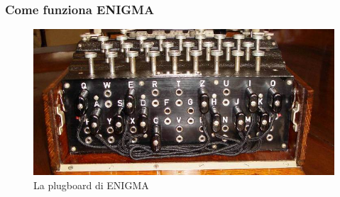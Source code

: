	\begin{frame}
		\frametitle{Come funziona ENIGMA}
		\begin{figure}[h]
			\centering
			\includegraphics[scale=0.5]{img/plugboard}
			\caption{La plugboard di ENIGMA}
			\label{fig:plugboard}
		\end{figure}
	\end{frame}
	
